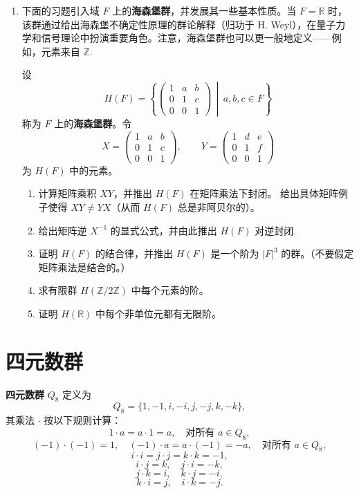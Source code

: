 \begin{enumerate}
\item 下面的习题引入域 \( F \) 上的\textbf{海森堡群}，并发展其一些基本性质。当 \( F = \mathbb{R} \) 时，该群通过给出海森堡不确定性原理的群论解释（归功于 H. Weyl），在量子力学和信号理论中扮演重要角色。注意，海森堡群也可以更一般地定义——例如，元素来自 \( \mathbb{Z} \).

设
\[
H(F) = \left\{ \begin{pmatrix} 1 & a & b \\ 0 & 1 & c \\ 0 & 0 & 1 \end{pmatrix} \,\middle|\, a, b, c \in F \right\}
\]
称为 \( F \) 上的\textbf{海森堡群}。令
\[
X = \begin{pmatrix} 1 & a & b \\ 0 & 1 & c \\ 0 & 0 & 1 \end{pmatrix}, \qquad
Y = \begin{pmatrix} 1 & d & e \\ 0 & 1 & f \\ 0 & 0 & 1 \end{pmatrix}
\]
为 \( H(F) \) 中的元素。
\begin{enumerate}[label=(\alph*)]
\item 计算矩阵乘积 \( XY \)，并推出 \( H(F) \) 在矩阵乘法下封闭。
给出具体矩阵例子使得 \( XY \neq YX \)（从而 \( H(F) \) 总是非阿贝尔的）。
\item 给出矩阵逆 \( X^{-1} \) 的显式公式，并由此推出 \( H(F) \) 对逆封闭.
\item 证明 \( H(F) \) 的结合律，并推出 \( H(F) \) 是一个阶为 \( |F|^3 \) 的群。（不要假定矩阵乘法是结合的。）
\item 求有限群 \( H(\mathbb{Z}/2\mathbb{Z}) \) 中每个元素的阶。
\item 证明 \( H(\mathbb{R}) \) 中每个非单位元都有无限阶。
\end{enumerate}
\end{enumerate}

\section{四元数群}

\textbf{四元数群} \(Q_8\) 定义为
\[
Q_8 = \{1, -1, i, -i, j, -j, k, -k\},
\]
其乘法 \(\cdot\) 按以下规则计算：
\[
1 \cdot a = a \cdot 1 = a, \quad \text{对所有 } a \in Q_8,
\]
\[
(-1) \cdot (-1) = 1, \quad (-1) \cdot a = a \cdot (-1) = -a, \quad \text{对所有 } a \in Q_8,
\]
\[
i \cdot i = j \cdot j = k \cdot k = -1,
\]
\[
i \cdot j = k, \quad j \cdot i = -k,
\]
\[
j \cdot k = i, \quad k \cdot j = -i,
\]
\[
k \cdot i = j, \quad i \cdot k = -j.
\]

